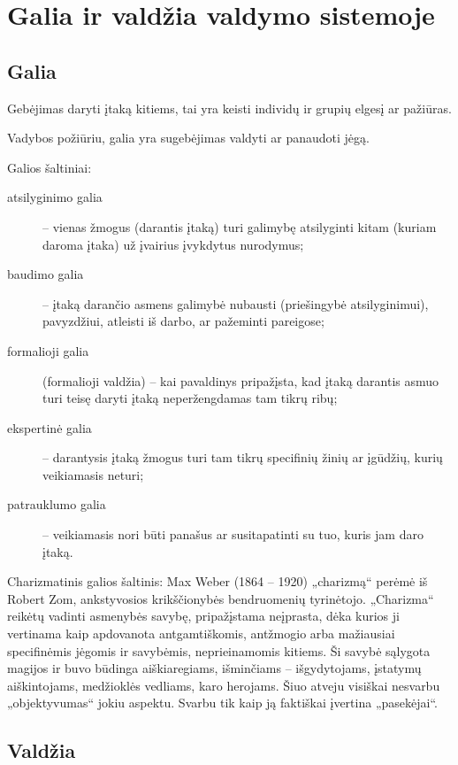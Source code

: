 \chapter{Galia ir valdžia valdymo sistemoje}

\section{Galia}

\begin{defn}[Galia]
  Gebėjimas daryti įtaką kitiems, tai yra keisti individų ir grupių
  elgesį ar pažiūras.
\end{defn}

Vadybos požiūriu, galia yra sugebėjimas valdyti ar panaudoti jėgą.

Galios šaltiniai:
\begin{description}
  \item[atsilyginimo galia] – vienas žmogus (darantis įtaką) turi
    galimybę atsilyginti kitam (kuriam daroma įtaka) už įvairius
    įvykdytus nurodymus;
  \item[baudimo galia] – įtaką darančio asmens galimybė nubausti
    (priešingybė atsilyginimui), pavyzdžiui, atleisti iš darbo,
    ar pažeminti pareigose;
  \item[formalioji galia] (formalioji valdžia) – kai pavaldinys
    pripažįsta, kad įtaką darantis asmuo turi teisę daryti įtaką
    neperžengdamas tam tikrų ribų;
  \item[ekspertinė galia] – darantysis įtaką žmogus turi tam tikrų
    specifinių žinių ar įgūdžių, kurių veikiamasis neturi;
  \item[patrauklumo galia] – veikiamasis nori būti panašus ar
    susitapatinti su tuo, kuris jam daro įtaką.
\end{description}

Charizmatinis galios šaltinis: Max Weber (1864 – 1920) „charizmą“ perėmė
iš Robert Zom, ankstyvosios krikščionybės bendruomenių tyrinėtojo.
„Charizma“ reikėtų vadinti asmenybės savybę, pripažįstama neįprasta,
dėka kurios ji vertinama kaip apdovanota antgamtiškomis, antžmogio
arba mažiausiai specifinėmis jėgomis ir savybėmis, neprieinamomis
kitiems. Ši savybė sąlygota magijos ir buvo būdinga aiškiaregiams,
išminčiams – išgydytojams, įstatymų aiškintojams, medžioklės vedliams,
karo herojams. Šiuo atveju visiškai nesvarbu „objektyvumas“ jokiu
aspektu. Svarbu tik kaip ją faktiškai įvertina „pasekėjai“.

\section{Valdžia}

